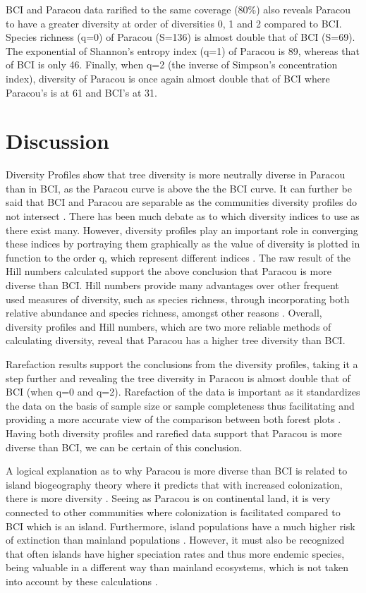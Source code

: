 \documentclass[fleqn,10pt]{ArtEcoFoG} %
\begin{document}
BCI and Paracou data rarified to the same coverage (80\%) also reveals
Paracou to have a greater diversity at order of diversities 0, 1 and 2
compared to BCI. Species richness (q=0) of Paracou (S=136) is almost
double that of BCI (S=69). The exponential of Shannon's entropy index
(q=1) of Paracou is 89, whereas that of BCI is only 46. Finally, when
q=2 (the inverse of Simpson's concentration index), diversity of Paracou
is once again almost double that of BCI where Paracou's is at 61 and
BCI's at 31.

\section{Discussion}\label{discussion}

Diversity Profiles show that tree diversity is more neutrally diverse in
Paracou than in BCI, as the Paracou curve is above the the BCI curve. It
can further be said that BCI and Paracou are separable as the
communities diversity profiles do not intersect \citep{marcon2017}.
There has been much debate as to which diversity indices to use as there
exist many. However, diversity profiles play an important role in
converging these indices by portraying them graphically as the value of
diversity is plotted in function to the order q, which represent
different indices \citep{Tothmeresz1995, marcon2017}. The raw result of
the Hill numbers calculated support the above conclusion that Paracou is
more diverse than BCI. Hill numbers provide many advantages over other
frequent used measures of diversity, such as species richness, through
incorporating both relative abundance and species richness, amongst
other reasons \citep{Chao2014}. Overall, diversity profiles and Hill
numbers, which are two more reliable methods of calculating diversity,
reveal that Paracou has a higher tree diversity than BCI.

Rarefaction results support the conclusions from the diversity profiles,
taking it a step further and revealing the tree diversity in Paracou is
almost double that of BCI (when q=0 and q=2). Rarefaction of the data is
important as it standardizes the data on the basis of sample size or
sample completeness thus facilitating and providing a more accurate view
of the comparison between both forest plots \citep{Chao2014}. Having
both diversity profiles and rarefied data support that Paracou is more
diverse than BCI, we can be certain of this conclusion.

A logical explanation as to why Paracou is more diverse than BCI is
related to island biogeography theory where it predicts that with
increased colonization, there is more diversity \citep{BRV:BRV510}.
Seeing as Paracou is on continental land, it is very connected to other
communities where colonization is facilitated compared to BCI which is
an island. Furthermore, island populations have a much higher risk of
extinction than mainland populations \citep{Frankham1997}. However, it
must also be recognized that often islands have higher speciation rates
and thus more endemic species, being valuable in a different way than
mainland ecosystems, which is not taken into account by these
calculations \citep{Kier9322}.
\end{document}
